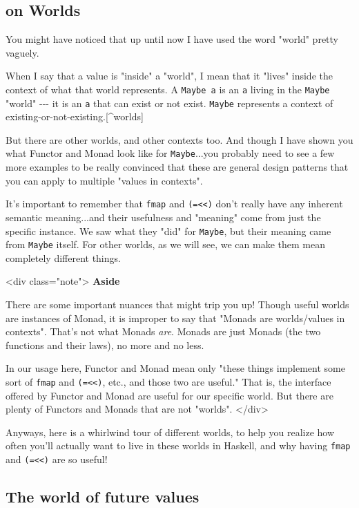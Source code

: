 \documentclass[]{article}
\begin{document}
\subsection{on Worlds}

You might have noticed that up until now I have used the word "world" pretty
vaguely.

When I say that a value is "inside" a "world", I mean that it "lives" inside the
context of what that world represents. A \texttt{Maybe\ a} is an \texttt{a}
living in the \texttt{Maybe} "world" -\/-\/- it is an \texttt{a} that can exist
or not exist. \texttt{Maybe} represents a context of
existing-or-not-existing.{[}\^{}worlds{]}

But there are other worlds, and other contexts too. And though I have shown you
what Functor and Monad look like for \texttt{Maybe}...you probably need to see a
few more examples to be really convinced that these are general design patterns
that you can apply to multiple "values in contexts".

It's important to remember that \texttt{fmap} and
\texttt{(=\textless{}\textless{})} don't really have any inherent semantic
meaning...and their usefulness and "meaning" come from just the specific
instance. We saw what they "did" for \texttt{Maybe}, but their meaning came from
\texttt{Maybe} itself. For other worlds, as we will see, we can make them mean
completely different things.

\textless{}div class="note"\textgreater{} \textbf{Aside}

There are some important nuances that might trip you up! Though useful worlds
are instances of Monad, it is improper to say that "Monads are worlds/values in
contexts". That's not what Monads \emph{are}. Monads are just Monads (the two
functions and their laws), no more and no less.

In our usage here, Functor and Monad mean only "these things implement some sort
of \texttt{fmap} and \texttt{(=\textless{}\textless{})}, etc., and those two are
useful." That is, the interface offered by Functor and Monad are useful for our
specific world. But there are plenty of Functors and Monads that are not
"worlds". \textless{}/div\textgreater{}

Anyways, here is a whirlwind tour of different worlds, to help you realize how
often you'll actually want to live in these worlds in Haskell, and why having
\texttt{fmap} and \texttt{(=\textless{}\textless{})} are so useful!

\subsection{The world of future values}
\end{document}
